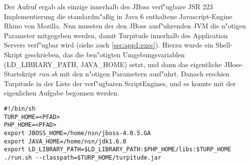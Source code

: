 Der Aufruf ergab als einzige innerhalb des JBoss verf"ugbare JSR 223 Implementierung die standardm"a\ss ig in Java 6
enthaltene Javascript-Engine Rhino von Mozilla. Nun mussten der den JBoss ausf"uhrenden JVM die n"otigen Parameter
mitgegeben werden, damit Turpitude innerhalb des Application Servers verf"ugbar wird (siehe auch \ref{sec:app1:exec}). 
Hierzu wurde ein Shell-Skript geschrieben, das die ben"otigten Umgebungsvariablen (LD\_LIBRARY\_PATH, JAVA\_HOME) setzt, 
und dann das eigentliche JBoss-Startskript \emph{run.sh} mit den n"otigen Parametern ausf"uhrt. 
Danach erschien Turpitude in der Liste der verf"ugbaren ScriptEngines, und es konnte mit der eigenlichen
Aufgabe begonnen werden.

\begin{lstlisting}[caption=JBoss Startskript]
#!/bin/sh
TURP_HOME=<PFAD>
PHP_HOME=<PFAD>
export JBOSS_HOME=/home/nsn/jboss-4.0.5.GA
export JAVA_HOME=/home/nsn/jdk1.6.0
export LD_LIBRARY_PATH=$LD_LIBRARY_PATH:$PHP_HOME/libs:$TURP_HOME
./run.sh --classpath=$TURP_HOME/turpitude.jar
\end{lstlisting}



